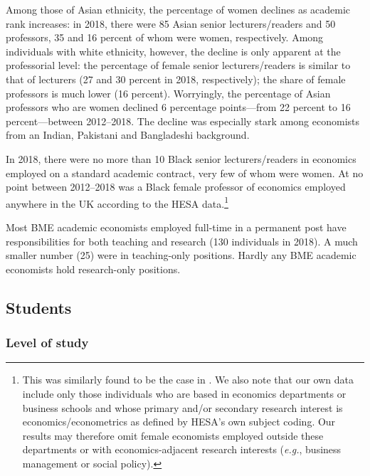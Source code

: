 \documentclass[a4paper, 1]{article}
\begin{document}
Among those of Asian ethnicity, the percentage of women declines as academic rank increases: in 2018, there were 85 Asian senior lecturers/readers and 50 professors, 35 and 16 percent of whom were women, respectively. Among individuals with white ethnicity, however, the decline is only apparent at the professorial level: the percentage of female senior lecturers/readers is similar to that of lecturers (27 and 30 percent in 2018, respectively); the share of female professors is much lower (16 percent). Worryingly, the percentage of Asian professors who are women declined 6 percentage points---from 22 percent to 16 percent---between 2012--2018. The decline was especially stark among economists from an Indian, Pakistani and Bangladeshi background.

In 2018, there were no more than 10 Black senior lecturers/readers in economics employed on a standard academic contract, very few of whom were women. At no point between 2012--2018 was a Black female professor of economics employed anywhere in the UK according to the HESA data.\footnote{This was similarly found to be the case in \citet{Blanco2010}. We also note that our own data include only those individuals who are based in economics departments or business schools and whose primary and/or secondary research interest is economics/econometrics as defined by HESA's own subject coding. Our results may therefore omit female economists employed outside these departments or with economics-adjacent research interests (\emph{e.g.}, business management or social policy).}

Most BME academic economists employed full-time in a permanent post have responsibilities for both teaching and research (130 individuals in 2018). A much smaller number (25) were in teaching-only positions. Hardly any BME academic economists hold research-only positions.

\hypertarget{sec:students}{%
\subsection{Students}\label{sec:students}}

\hypertarget{level-of-study}{%
\subsubsection{Level of study}\label{level-of-study}}
\end{document}
